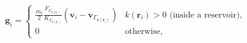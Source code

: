 \documentclass[12pt]{article}
\begin{document}
 \begin{equation*}
      \mathbf g_i = 
      \begin{cases} \frac{m_i}{2}   \frac{ F_{\Gamma_{k(\mathbf r_i)}}}{ K_{\Gamma_{k(\mathbf r_i)}}} 
               \left(\mathbf v_i -  \mathbf v_{\Gamma_{k(\mathbf r_i)}} \right) &  \mbox{$k(\mathbf r_i)> 0$ (inside a reservoir),} \\
                  0                                     &  \mbox{otherwise, } 
      \end{cases}
  \end{equation*}
\end{document}
